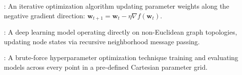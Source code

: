 \begin{description}[leftmargin=!,labelwidth=4.5cm,itemsep=1.5ex]
\item[\textbf{Gradient Descent}\hfill \textnormal{\sffamily\scriptsize\color{keyideablue}[Optimization]}]: An iterative optimization algorithm updating parameter weights along the negative gradient direction: $\mathbf{w}_{t+1} = \mathbf{w}_t - \eta \nabla f(\mathbf{w}_t)$.
\item[\textbf{Graph Neural Network (GNN)}\hfill \textnormal{\sffamily\scriptsize\color{keyideablue}[Specialized Architectures]}]: A deep learning model operating directly on non-Euclidean graph topologies, updating node states via recursive neighborhood message passing.
\item[\textbf{Grid Search}\hfill \textnormal{\sffamily\scriptsize\color{keyideablue}[Hyperparameter Tuning]}]: A brute-force hyperparameter optimization technique training and evaluating models across every point in a pre-defined Cartesian parameter grid.
\end{description}

